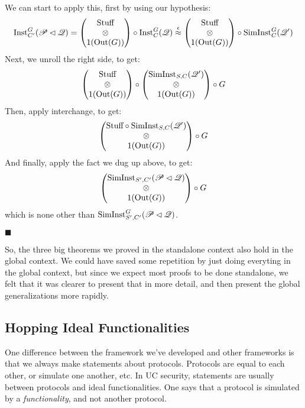\begin{theorem}
  We can start to apply this, first by using our hypothesis:
  $$
  \text{Inst}^G_{C'}(\mathscr{P} \lhd \mathscr{Q}) =
  \begin{pmatrix}
    \text{Stuff}\cr
    \otimes\cr
    1(\text{Out}(G))
  \end{pmatrix}
  \circ \text{Inst}^G_C(\mathscr{Q})
  \overset{\epsilon}{\approx}
  \begin{pmatrix}
    \text{Stuff}\cr
    \otimes\cr
    1(\text{Out}(G))
  \end{pmatrix}
  \circ \text{SimInst}^G_C(\mathscr{Q}')
  $$
  Next, we unroll the right side, to get:
  $$
  \begin{pmatrix}
    \text{Stuff}\cr
    \otimes\cr
    1(\text{Out}(G))
  \end{pmatrix}
  \circ
  \begin{pmatrix}
    \text{SimInst}_{S, C}(\mathscr{Q}')\cr
    \otimes\cr
    1(\text{Out}(G))
  \end{pmatrix}
  \circ
  G
  $$
  Then, apply interchange, to get:
  $$
  \begin{pmatrix}
    \text{Stuff} \circ \text{SimInst}_{S, C}(\mathscr{Q}')\cr
    \otimes\cr
    1(\text{Out}(G))
  \end{pmatrix}
  \circ
  G
  $$
  And finally, apply the fact we dug up above, to get:
  $$
  \begin{pmatrix}
    \text{SimInst}_{S', C'}(\mathscr{P} \lhd \mathscr{Q})\cr
    \otimes\cr
    1(\text{Out}(G))
  \end{pmatrix}
  \circ
  G
  $$
  which is none other than $\text{SimInst}^G_{S', C'}(\mathscr{P} \lhd \mathscr{Q})$.

  $\blacksquare$
\end{theorem}

So, the three big theorems we proved in the standalone context
also hold in the global context.
We could have saved some repetition by just doing everyting in the global
context, but since we expect most proofs to be done standalone,
we felt that it was clearer to present that in more detail,
and then present the global generalizations more rapidly.

\subsection{Hopping Ideal Functionalities}

One difference between the framework we've developed and other
frameworks is that we always make statements about protocols.
Protocols are equal to each other, or simulate one another, etc.
In UC security, statements are usually between protocols and ideal functionalities.
One says that a protocol is simulated by a \emph{functionality},
and not another protocol.

